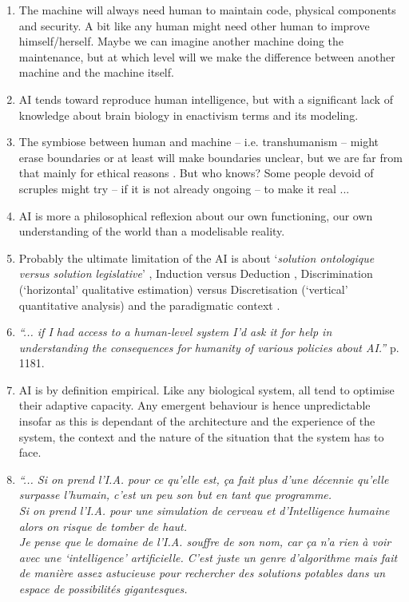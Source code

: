 \documentclass{article}
\begin{document}
\begin{enumerate}[leftmargin=*,label=\underline{\textit{Statement} \arabic*} :]
\item The machine will always need human to maintain code, physical components and security. A bit like any human might need other human to improve himself/herself. Maybe we can imagine another machine doing the maintenance, but at which level will we make the difference between another machine and the machine itself.
\item AI tends toward reproduce human intelligence, but with a significant lack of knowledge about brain biology in enactivism terms and its modeling.
\item The symbiose between human and machine -- i.e. transhumanism --  might erase boundaries or at least will make boundaries unclear, but we are far from that mainly for ethical reasons \citep{hgw}.  But who knows? Some people devoid of scruples might try -- if it is not already ongoing -- to make it real ...
\item AI is more a philosophical reflexion about our own functioning, our own understanding of the world than a modelisable reality.
\item Probably the ultimate limitation of the AI is about `\textit{solution ontologique versus solution legislative}' \citep{cse}, Induction versus Deduction \citep{fxd}, Discrimination (`horizontal' qualitative estimation) versus  Discretisation (`vertical' quantitative analysis) and the paradigmatic context \citep{herz}.
\item \textsl{``... if I had access to a human-level system I’d ask it for help in understanding the consequences for humanity of various policies about AI.''} \citep{jmc} p. 1181.
\item AI is by definition empirical. Like any biological system, all tend to optimise their adaptive capacity. Any emergent behaviour is hence unpredictable insofar as this is dependant of the architecture and the experience of the system, the context and the nature of the situation that the system has to face.
\item \textit{``... Si on prend l'I.A. pour ce qu'elle est, ça fait plus d'une décennie qu'elle surpasse l'humain, c'est un peu son but en tant que programme.\\
Si on prend l'I.A. pour une simulation de cerveau et d'Intelligence humaine alors on risque de tomber de haut.\\
Je pense que le domaine de l'I.A. souffre de son nom, car ça n'a rien à voir avec une `intelligence' artificielle. C'est juste un genre d'algorithme mais fait de manière assez astucieuse pour rechercher des solutions potables dans un espace de possibilités gigantesques.\\
}
\end{enumerate}
\end{document}
